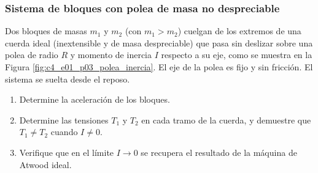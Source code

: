 \subsubsection{Sistema de bloques con polea de masa no despreciable}

Dos bloques de masas $m_1$ y $m_2$ (con $m_1 > m_2$) cuelgan de los extremos de una cuerda ideal (inextensible y de masa despreciable) que pasa sin deslizar sobre una polea de radio $R$ y momento de inercia $I$ respecto a su eje, como se muestra en la Figura \ref{fig:c4_e01_p03_polea_inercia}. El eje de la polea es fijo y sin fricción. El sistema se suelta desde el reposo.

\begin{enumerate}
    \item Determine la aceleración de los bloques.
    \item Determine las tensiones $T_1$ y $T_2$ en cada tramo de la cuerda, y demuestre que $T_1 \neq T_2$ cuando $I \neq 0$.
    \item Verifique que en el límite $I \to 0$ se recupera el resultado de la máquina de Atwood ideal.
\end{enumerate}


